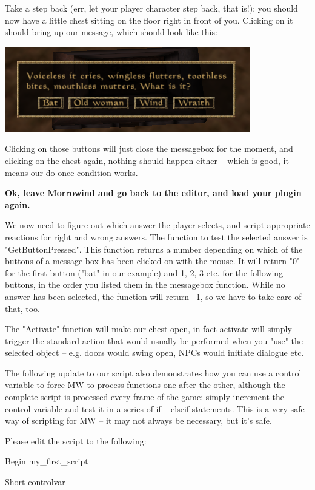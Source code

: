 \documentclass[
]{article}
\begin{document}
Take a step back (err, let your player character step back, that is!);
you should now have a little chest sitting on the floor right in front
of you. Clicking on it should bring up our message, which should look
like this:

\includegraphics{media/image3.png}

Clicking on those buttons will just close the messagebox for the moment,
and clicking on the chest again, nothing should happen either -- which
is good, it means our do-once condition works.

\textbf{Ok, leave Morrowind and go back to the editor, and load your
plugin again.}

We now need to figure out which answer the player selects, and script
appropriate reactions for right and wrong answers. The function to test
the selected answer is "GetButtonPressed". This function returns a
number depending on which of the buttons of a message box has been
clicked on with the mouse. It will return "0" for the first button
("bat" in our example) and 1, 2, 3 etc. for the following buttons, in
the order you listed them in the messagebox function. While no answer
has been selected, the function will return --1, so we have to take care
of that, too.

The "Activate" function will make our chest open, in fact activate will
simply trigger the standard action that would usually be performed when
you "use" the selected object -- e.g. doors would swing open, NPCs would
initiate dialogue etc.

The following update to our script also demonstrates how you can use a
control variable to force MW to process functions one after the other,
although the complete script is processed every frame of the game:
simply increment the control variable and test it in a series of if --
elseif statements. This is a very safe way of scripting for MW -- it may
not always be necessary, but it's safe.

Please edit the script to the following:

Begin my\_first\_script

Short controlvar
\end{document}
